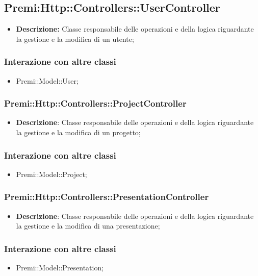 	\subsection*{Premi:Http::Controllers::UserController}
		\begin{itemize}
			\item \textbf{Descrizione:} Classe responsabile delle operazioni e della logica riguardante la gestione e la modifica di un utente;
		\end{itemize}
		\subsubsection*{Interazione con altre classi}
		\begin{itemize}
			\item Premi::Model::User;
		\end{itemize}
			
	\subsubsection*{Premi::Http::Controllers::ProjectController}
			\begin{itemize}
				\item \textbf{Descrizione}: Classe responsabile delle operazioni e della logica riguardante la gestione e la modifica di un progetto;
			\end{itemize}
			\subsubsection*{Interazione con altre classi}
			\begin{itemize}
				\item Premi::Model::Project;
			\end{itemize}
			
   \subsubsection*{Premi::Http::Controllers::PresentationController}
			\begin{itemize}
				\item \textbf{Descrizione}: Classe responsabile delle operazioni e della logica riguardante la gestione e la modifica di una presentazione;
			\end{itemize}
			\subsubsection*{Interazione con altre classi}
			\begin{itemize}
				\item Premi::Model::Presentation;
			\end{itemize}
			
